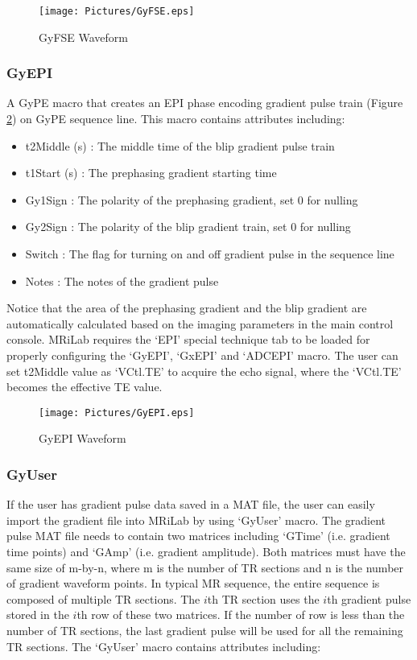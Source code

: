 \documentclass{book}%
\begin{document}
\begin{figure}[htbp]
	\centering
		\texttt{[image: Pictures/GyFSE.eps]}
	\caption{GyFSE Waveform}
	\label{fig:GyFSE}
\end{figure}

\subsubsection{GyEPI}

A GyPE macro that creates an EPI phase encoding gradient pulse train (Figure \ref{fig:GyEPI}) on GyPE sequence line. This macro contains attributes including:

\begin{itemize}
	\item t2Middle (s) : The middle time of the blip gradient pulse train
	\item t1Start (s) : The prephasing gradient starting time
	\item Gy1Sign : The polarity of the prephasing gradient, set 0 for nulling
	\item Gy2Sign : The polarity of the blip gradient train, set 0 for nulling
	\item Switch : The flag for turning on and off gradient pulse in the sequence line
	\item Notes : The notes of the gradient pulse 
\end{itemize}

Notice that the area of the prephasing gradient and the blip gradient are automatically calculated based on the imaging parameters in the main control console. MRiLab requires the `EPI' special technique tab to be loaded for properly configuring the `GyEPI', `GxEPI' and `ADCEPI' macro. The user can set t2Middle value as `VCtl.TE' to acquire the echo signal, where the `VCtl.TE' becomes the effective TE value.

\begin{figure}[htbp]
	\centering
		\texttt{[image: Pictures/GyEPI.eps]}
	\caption{GyEPI Waveform}
	\label{fig:GyEPI}
\end{figure}


\subsubsection{GyUser}

If the user has gradient pulse data saved in a MAT file, the user can easily import the gradient file into MRiLab by using `GyUser' macro. The gradient pulse MAT file needs to contain two matrices including `GTime' (i.e. gradient time points) and `GAmp' (i.e. gradient amplitude). Both matrices must have the same size of m-by-n, where m is the number of TR sections and n is the number of gradient waveform points. In typical MR sequence, the entire sequence is composed of multiple TR sections. The $i$th TR section uses the $i$th gradient pulse stored in the $i$th row of these two matrices. If the number of row is less than the number of TR sections, the last gradient pulse will be used for all the remaining TR sections. The `GyUser' macro contains attributes including:
\end{document}
